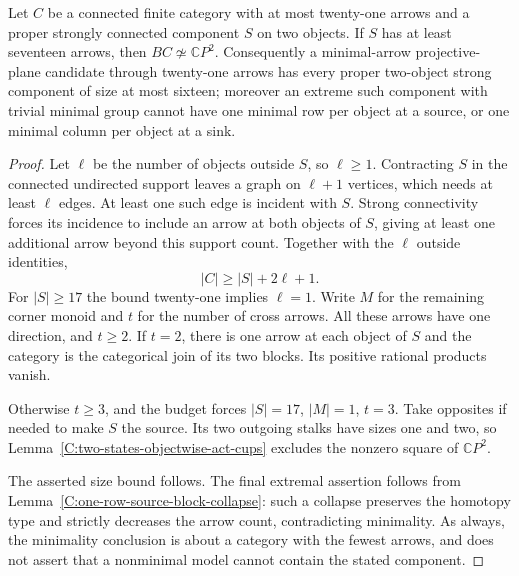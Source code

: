 \begin{proposition}\label{C:proper-strong-pair-at-least-seventeen}
Let $C$ be a connected finite category with at most twenty-one
arrows and a proper strongly connected component $S$ on two
objects. If $S$ has at least seventeen arrows, then
$BC\not\simeq\mathbb CP^2$.
Consequently a minimal-arrow projective-plane candidate through
twenty-one arrows has every proper two-object strong component
of size at most sixteen; moreover an extreme such component
with trivial minimal group cannot have one minimal row per
object at a source, or one minimal column per object at a sink.
\end{proposition}
\begin{proof}
Let $\ell$ be the number of objects outside $S$, so $\ell\geq1$.
Contracting $S$ in the connected undirected support leaves a
graph on $\ell+1$ vertices, which needs at least $\ell$ edges.
At least one such edge is incident with $S$. Strong connectivity
forces its incidence to include an arrow at both objects of $S$,
giving at least one additional arrow beyond this support count.
Together with the $\ell$ outside identities,
\[
 |C|\geq |S|+2\ell+1.
\]
For $|S|\geq17$ the bound twenty-one implies $\ell=1$.
Write $M$ for the remaining corner monoid and $t$ for the
number of cross arrows. All these arrows have one direction,
and $t\geq2$. If $t=2$, there is one arrow at each object of
$S$ and the category is the categorical join of its two blocks.
Its positive rational products vanish.

Otherwise $t\geq3$, and the budget forces
$|S|=17$, $|M|=1$, $t=3$. Take opposites if needed to make
$S$ the source. Its two outgoing stalks have sizes one and two,
so Lemma~\ref{C:two-states-objectwise-act-cups} excludes the
nonzero square of $\mathbb CP^2$.

The asserted size bound follows. The final extremal assertion
follows from Lemma~\ref{C:one-row-source-block-collapse}:
such a collapse preserves the homotopy type and strictly
decreases the arrow count, contradicting minimality. As always,
the minimality conclusion is about a category with the fewest
arrows, and does not assert that a nonminimal model cannot
contain the stated component.
\end{proof}
